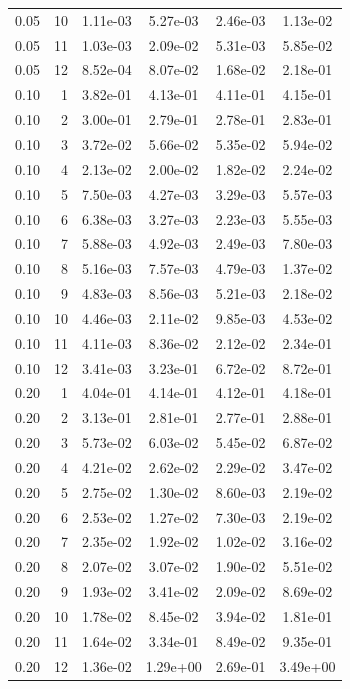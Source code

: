 \begin{longtable}{S[table-format=1.2] r S[table-format=1.2e-2] S[table-format=1.2e-2] S[table-format=1.2e-2] S[table-format=1.2e-2]}
0.05 & 10 & 1.11e-03 & 5.27e-03 & 2.46e-03 & 1.13e-02 \\
0.05 & 11 & 1.03e-03 & 2.09e-02 & 5.31e-03 & 5.85e-02 \\
0.05 & 12 & 8.52e-04 & 8.07e-02 & 1.68e-02 & 2.18e-01 \\
0.10 & 1 & 3.82e-01 & 4.13e-01 & 4.11e-01 & 4.15e-01 \\
0.10 & 2 & 3.00e-01 & 2.79e-01 & 2.78e-01 & 2.83e-01 \\
0.10 & 3 & 3.72e-02 & 5.66e-02 & 5.35e-02 & 5.94e-02 \\
0.10 & 4 & 2.13e-02 & 2.00e-02 & 1.82e-02 & 2.24e-02 \\
0.10 & 5 & 7.50e-03 & 4.27e-03 & 3.29e-03 & 5.57e-03 \\
0.10 & 6 & 6.38e-03 & 3.27e-03 & 2.23e-03 & 5.55e-03 \\
0.10 & 7 & 5.88e-03 & 4.92e-03 & 2.49e-03 & 7.80e-03 \\
0.10 & 8 & 5.16e-03 & 7.57e-03 & 4.79e-03 & 1.37e-02 \\
0.10 & 9 & 4.83e-03 & 8.56e-03 & 5.21e-03 & 2.18e-02 \\
0.10 & 10 & 4.46e-03 & 2.11e-02 & 9.85e-03 & 4.53e-02 \\
0.10 & 11 & 4.11e-03 & 8.36e-02 & 2.12e-02 & 2.34e-01 \\
0.10 & 12 & 3.41e-03 & 3.23e-01 & 6.72e-02 & 8.72e-01 \\
0.20 & 1 & 4.04e-01 & 4.14e-01 & 4.12e-01 & 4.18e-01 \\
0.20 & 2 & 3.13e-01 & 2.81e-01 & 2.77e-01 & 2.88e-01 \\
0.20 & 3 & 5.73e-02 & 6.03e-02 & 5.45e-02 & 6.87e-02 \\
0.20 & 4 & 4.21e-02 & 2.62e-02 & 2.29e-02 & 3.47e-02 \\
0.20 & 5 & 2.75e-02 & 1.30e-02 & 8.60e-03 & 2.19e-02 \\
0.20 & 6 & 2.53e-02 & 1.27e-02 & 7.30e-03 & 2.19e-02 \\
0.20 & 7 & 2.35e-02 & 1.92e-02 & 1.02e-02 & 3.16e-02 \\
0.20 & 8 & 2.07e-02 & 3.07e-02 & 1.90e-02 & 5.51e-02 \\
0.20 & 9 & 1.93e-02 & 3.41e-02 & 2.09e-02 & 8.69e-02 \\
0.20 & 10 & 1.78e-02 & 8.45e-02 & 3.94e-02 & 1.81e-01 \\
0.20 & 11 & 1.64e-02 & 3.34e-01 & 8.49e-02 & 9.35e-01 \\
0.20 & 12 & 1.36e-02 & 1.29e+00 & 2.69e-01 & 3.49e+00 \\

\end{longtable}
